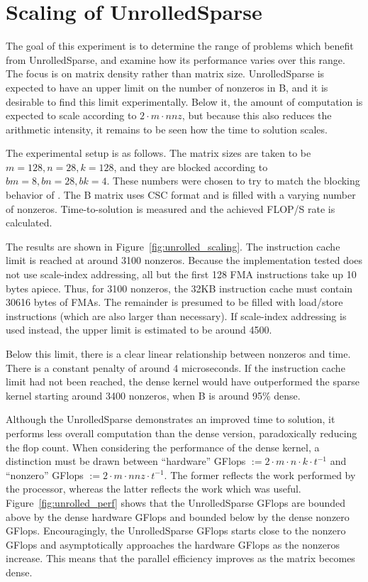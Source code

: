 \section{Scaling of UnrolledSparse}
\label{section:exp_unrolled_scaling}

The goal of this experiment is to determine the range of problems which benefit from UnrolledSparse, and examine how its performance varies over this range. The focus is on matrix density rather than matrix size. UnrolledSparse is expected to have an upper limit on the number of nonzeros in B, and it is desirable to find this limit experimentally. Below it, the amount of computation is expected to scale according to $2\cdot m \cdot nnz$, but because this also reduces the arithmetic intensity, it remains to be seen how the time to solution scales.

The experimental setup is as follows. The matrix sizes are taken to be $m=128, n=28, k=128$, and they are blocked according to $bm=8, bn=28, bk=4$. These numbers were chosen to try to match the blocking behavior of . The B matrix uses CSC format and is filled with a varying number of nonzeros. Time-to-solution is measured and the achieved FLOP/S rate is calculated.

The results are shown in Figure~\ref{fig:unrolled_scaling}. The instruction cache limit is reached at around 3100 nonzeros. Because the implementation tested does not use scale-index addressing, all but the first 128 FMA instructions take up 10 bytes apiece. Thus, for 3100 nonzeros, the 32KB instruction cache must contain 30616 bytes of FMAs. The remainder is presumed to be filled with load/store instructions (which are also larger than necessary). If scale-index addressing is used instead, the upper limit is estimated to be around 4500. 

Below this limit, there is a clear linear relationship between nonzeros and time. There is a constant penalty of around 4 microseconds. If the instruction cache limit had not been reached, the dense kernel would have outperformed the sparse kernel starting around 3400 nonzeros, when B is around 95\% dense.


Although the UnrolledSparse demonstrates an improved time to solution, it performs less overall computation than the dense version, paradoxically reducing the flop count. When considering the performance of the dense kernel, a distinction must be drawn between ``hardware'' GFlops $:= 2\cdot m \cdot n \cdot k \cdot t^{-1}$ and ``nonzero'' GFlops $:= 2 \cdot m \cdot nnz \cdot t^{-1}$. The former reflects the work performed by the processor, whereas the latter reflects the work which was useful. Figure~\ref{fig:unrolled_perf} shows that the UnrolledSparse GFlops are bounded above by the dense hardware GFlops and bounded below by the dense nonzero GFlops. Encouragingly, the UnrolledSparse GFlops starts close to the nonzero GFlops and asymptotically approaches the hardware GFlops as the nonzeros increase. This means that the parallel efficiency improves as the matrix becomes dense.


